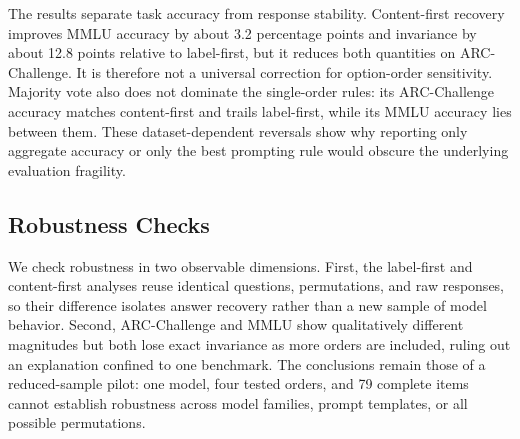 \begin{table}[tb]
  \centering
  \small
  \ifdim\wd0>\linewidth\resizebox{\linewidth}{!}{\usebox0}\else\usebox0\fi
  \caption{Measured accuracy and exact semantic invariance across datasets and decision rules.}
  \label{tab:main-results}
\end{table}


The results separate task accuracy from response stability. Content-first recovery improves MMLU accuracy by about 3.2 percentage points and invariance by about 12.8 points relative to label-first, but it reduces both quantities on ARC-Challenge. It is therefore not a universal correction for option-order sensitivity. Majority vote also does not dominate the single-order rules: its ARC-Challenge accuracy matches content-first and trails label-first, while its MMLU accuracy lies between them. These dataset-dependent reversals show why reporting only aggregate accuracy or only the best prompting rule would obscure the underlying evaluation fragility.


\subsection{Robustness Checks}

We check robustness in two observable dimensions. First, the label-first and content-first analyses reuse identical questions, permutations, and raw responses, so their difference isolates answer recovery rather than a new sample of model behavior. Second, ARC-Challenge and MMLU show qualitatively different magnitudes but both lose exact invariance as more orders are included, ruling out an explanation confined to one benchmark. The conclusions remain those of a reduced-sample pilot: one model, four tested orders, and 79 complete items cannot establish robustness across model families, prompt templates, or all possible permutations.
